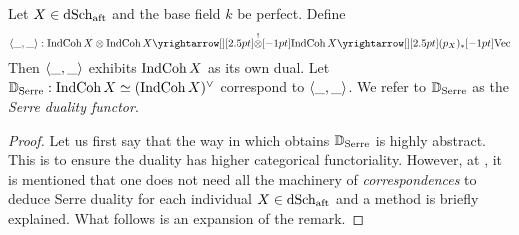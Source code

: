 \documentclass[./main.tex]{subfiles}
\begin{document}
\begin{prop}
  
  Let $X \in \mathrm{dSch}_{\mathrm{aft}}$ and the base field $k$ be perfect.
  Define \[
    \<\_,\_\> : 
    \INDCOH\,X \otimes \INDCOH\,X \map{\OTIMES}{} 
    \INDCOH\,X \map{(p_X)_*}{} \VEC
  \]
  Then $\langle\_,\_\rangle$ exhibits $\mathrm{IndCoh}\,X$ as its own dual.
  Let $\mathbb{D}_{\mathrm{Serre}} : \mathrm{IndCoh}\,X \simeq (\mathrm{IndCoh}\,X)^\vee$
  correspond to $\langle\_,\_\rangle$. 
  We refer to $\mathbb{D}_{\mathrm{Serre}}$ as the \emph{Serre duality functor}.
\end{prop}
\begin{proof}
  Let us first say that the way in which \cite{GR1} obtains
  $\mathbb{D}_{\mathrm{Serre}}$ is highly abstract.
  This is to ensure the duality has higher categorical functoriality.
  However, at \cite[Ch 5 , Rmk 4.2.8]{GR1},
  it is mentioned that one does not need all the machinery of 
  \emph{correspondences} to deduce Serre duality for each
  individual $X \in \mathrm{dSch}_{\mathrm{aft}}$ and a method is briefly explained.
  What follows is an expansion of the remark.
  

\end{proof}
\end{document}
